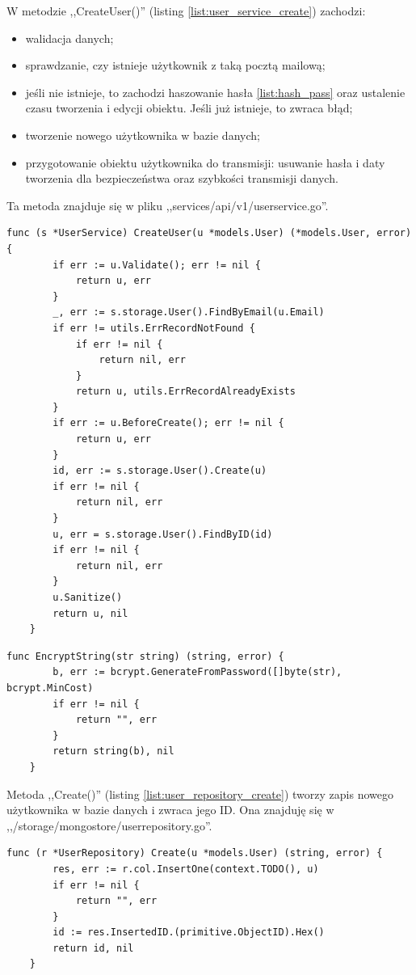 W metodzie ,,CreateUser()'' (listing \ref{list:user_service_create}) zachodzi:
\begin{itemize}
    \item walidacja danych;
    \item sprawdzanie, czy istnieje użytkownik z taką pocztą mailową;
    \item jeśli nie istnieje, to zachodzi haszowanie hasła \ref{list:hash_pass} oraz ustalenie czasu tworzenia i edycji obiektu. Jeśli już istnieje, to zwraca błąd;
    \item tworzenie nowego użytkownika w bazie danych;
    \item przygotowanie obiektu użytkownika do transmisji: usuwanie hasła i daty tworzenia dla bezpieczeństwa oraz szybkości transmisji danych.
\end{itemize}
Ta metoda znajduje się w pliku ,,services/api/v1/userservice.go''.
\begin{lstlisting}[label=list:user_service_create,caption=Serwis tworzenia użytkownika,basicstyle=\tiny\ttfamily]
    func (s *UserService) CreateUser(u *models.User) (*models.User, error) {
        if err := u.Validate(); err != nil {
            return u, err
        }
        _, err := s.storage.User().FindByEmail(u.Email)
        if err != utils.ErrRecordNotFound {
            if err != nil {
                return nil, err
            }
            return u, utils.ErrRecordAlreadyExists
        }
        if err := u.BeforeCreate(); err != nil {
            return u, err
        }
        id, err := s.storage.User().Create(u)
        if err != nil {
            return nil, err
        }
        u, err = s.storage.User().FindByID(id)
        if err != nil {
            return nil, err
        }
        u.Sanitize()
        return u, nil
    }
\end{lstlisting}
\begin{lstlisting}[label=list:hash_pass,caption=Haszowanie hasła,basicstyle=\tiny\ttfamily]
    func EncryptString(str string) (string, error) {
        b, err := bcrypt.GenerateFromPassword([]byte(str), bcrypt.MinCost)
        if err != nil {
            return "", err
        }
        return string(b), nil
    }
\end{lstlisting}

Metoda ,,Create()'' (listing \ref{list:user_repository_create}) tworzy zapis nowego użytkownika w bazie danych i zwraca jego ID.
Ona znajduję się w ,,/storage/mongostore/userrepository.go''.
\begin{lstlisting}[label=list:user_repository_create,caption=Zachowanie użytkownika do bazy danych,basicstyle=\tiny\ttfamily]
    func (r *UserRepository) Create(u *models.User) (string, error) {
        res, err := r.col.InsertOne(context.TODO(), u)
        if err != nil {
            return "", err
        }
        id := res.InsertedID.(primitive.ObjectID).Hex()
        return id, nil
    }
\end{lstlisting}

